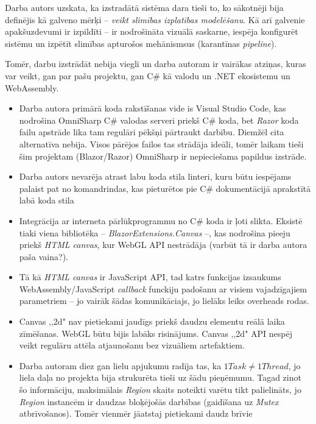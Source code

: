 Darba autors uzskata, ka izstradātā sistēma dara tieši to, ko sākotnēji bija
definējis kā galveno mērķi -- \emph{veikt slimības izplatības modelēšanu}. Kā arī
galvenie apakšuzdevumi ir izpildīti -- ir nodrošināta vizuālā saskarne, iespēja
konfigurēt sistēmu un izpētīt slimības apturošos mehānismsus (karantīnas \emph{pipeline}).

Tomēr, darbu izstrādāt nebija viegli un darba autoram ir vairākas atziņas, kuras
var veikt, gan par pašu projektu, gan C\# kā valodu un .NET ekosistemu un WebAssembly.

\begin{itemize}
    \item Darba autora primārā koda rakstīšanas vide is Visual Studio Code, kas
    nodrošina OmniSharp C\# valodas serveri priekš C\# koda, bet \emph{Razor} koda
    failu apstrāde lika tam regulāri pēkšņi pārtraukt darbību. Diemžēl cita alternatīva
    nebija. Visos pārējos failos tas strādāja ideāli, tomēr laikam tieši šim projektam
    (Blazor/Razor) OmniSharp ir nepieciešama papildus izstrāde.
    \item Darba autors nevarēja atrast labu koda stila linteri, kuru būtu iespējams
    palaist pat no komandrindas, kas pieturētos pie C\# dokumentācijā aprakstītā labā koda stila %
    \item Integrācija ar interneta pārlūkprogrammu no C\# koda ir ļoti slikta.
    Eksistē tiaki viena bibliotēka -- \emph{BlazorExtensions.Canvas} --, kas
    nodrošina pieeju priekš \emph{HTML canvas}, kur WebGL API nestrādāja (varbūt
    tā ir darba autora paša vaina?).
    \item Tā kā \emph{HTML canvas} ir
    JavaScript API, tad katrs funkcijas izsaukums WebAssembly/JavaScript \emph{callback}
    funckiju padošanu ar visiem vajadzīgajiem parametriem -- jo vairāk šādas
    komunikāciajs, jo lielāks leiks overheads rodas.
    \item Canvas ,,2d" nav pietiekami jaudīgs priekš daudzu elementu reālā laika
    zīmēšanas. WebGL būtu bijis labāks risinājums. Canvas ,,2d" API nespēj veikt
    regulāru attēla atjaunošanu bez vizuāliem artefaktiem.
    \item Darba autoram diez gan lielu apjukumu radīja tas, ka \(1 Task\neq 1 Thread\),
    jo liela daļa no projekta bija strukurēta tieši uz šādu pieņēmumu. Tagad zinot
    šo informāciju, maksimālais \emph{Region} skaits noteikti varētu tikt palielināts,
    jo \emph{Region} instancēm ir daudzas bloķējošās darbības (gaidīšana uz
    \emph{Mutex} atbrīvošanos). Tomēr vienmēr jāatstaj pietiekami daudz brīvie

\end{itemize}
